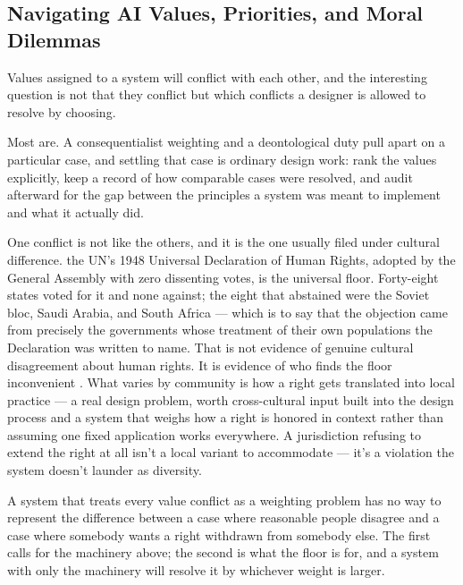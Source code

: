 \subsection{Navigating AI Values, Priorities, and Moral Dilemmas}
\label{sec:2.1.3}
Values assigned to a system will conflict with each other, and the interesting question is not that they conflict but which conflicts a designer is allowed to resolve by choosing.

Most are. A consequentialist weighting and a deontological duty pull apart on a particular case, and settling that case is ordinary design work: rank the values explicitly, keep a record of how comparable cases were resolved, and audit afterward for the gap between the principles a system was meant to implement and what it actually did.

One conflict is not like the others, and it is the one usually filed under cultural difference. the UN's 1948 Universal Declaration of Human Rights, adopted by the General Assembly with zero dissenting votes, is the universal floor. Forty-eight states voted for it and none against; the eight that abstained were the Soviet bloc, Saudi Arabia, and South Africa — which is to say that the objection came from precisely the governments whose treatment of their own populations the Declaration was written to name. That is not evidence of genuine cultural disagreement about human rights. It is evidence of who finds the floor inconvenient \autocite{un1948udhr}. What varies by community is how a right gets translated into local practice — a real design problem, worth cross-cultural input built into the design process and a system that weighs how a right is honored in context rather than assuming one fixed application works everywhere. A jurisdiction refusing to extend the right at all isn't a local variant to accommodate — it's a violation the system doesn't launder as diversity.

A system that treats every value conflict as a weighting problem has no way to represent the difference between a case where reasonable people disagree and a case where somebody wants a right withdrawn from somebody else. The first calls for the machinery above; the second is what the floor is for, and a system with only the machinery will resolve it by whichever weight is larger.
